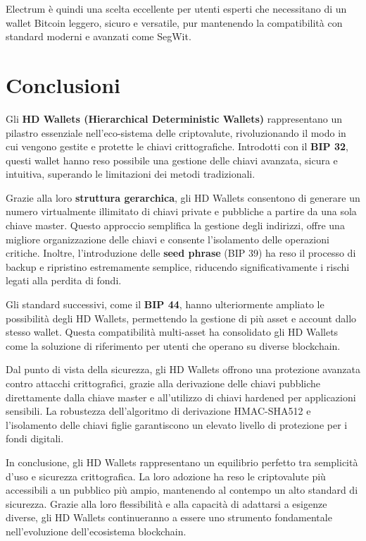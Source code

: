 \documentclass{article}
\begin{document}
Electrum è quindi una scelta eccellente per utenti esperti che necessitano di un wallet Bitcoin leggero, sicuro e versatile, pur mantenendo la compatibilità con standard moderni e avanzati come SegWit.


\section{Conclusioni}
Gli \textbf{HD Wallets (Hierarchical Deterministic Wallets)} rappresentano un pilastro essenziale nell'eco-sistema delle criptovalute, rivoluzionando il modo in cui vengono gestite e protette le chiavi crittografiche. Introdotti con il \textbf{BIP 32}, questi wallet hanno reso possibile una gestione delle chiavi avanzata, sicura e intuitiva, superando le limitazioni dei metodi tradizionali.

Grazie alla loro \textbf{struttura gerarchica}, gli HD Wallets consentono di generare un numero virtualmente illimitato di chiavi private e pubbliche a partire da una sola chiave master. Questo approccio semplifica la gestione degli indirizzi, offre una migliore organizzazione delle chiavi e consente l'isolamento delle operazioni critiche. Inoltre, l'introduzione delle \textbf{seed phrase} (BIP 39) ha reso il processo di backup e ripristino estremamente semplice, riducendo significativamente i rischi legati alla perdita di fondi.

Gli standard successivi, come il \textbf{BIP 44}, hanno ulteriormente ampliato le possibilità degli HD Wallets, permettendo la gestione di più asset e account dallo stesso wallet. Questa compatibilità multi-asset ha consolidato gli HD Wallets come la soluzione di riferimento per utenti che operano su diverse blockchain.

Dal punto di vista della sicurezza, gli HD Wallets offrono una protezione avanzata contro attacchi crittografici, grazie alla derivazione delle chiavi pubbliche direttamente dalla chiave master e all'utilizzo di chiavi hardened per applicazioni sensibili. La robustezza dell'algoritmo di derivazione HMAC-SHA512 e l'isolamento delle chiavi figlie garantiscono un elevato livello di protezione per i fondi digitali.

In conclusione, gli HD Wallets rappresentano un equilibrio perfetto tra semplicità d'uso e sicurezza crittografica. La loro adozione ha reso le criptovalute più accessibili a un pubblico più ampio, mantenendo al contempo un alto standard di sicurezza. Grazie alla loro flessibilità e alla capacità di adattarsi a esigenze diverse, gli HD Wallets continueranno a essere uno strumento fondamentale nell'evoluzione dell'ecosistema blockchain.
\end{document}
